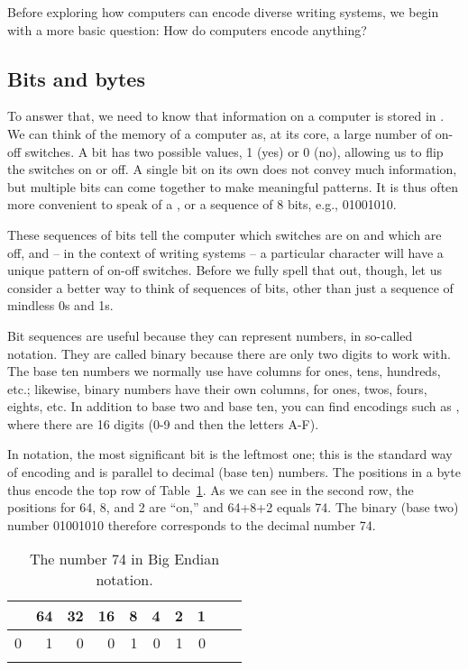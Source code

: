 Before exploring how computers can encode diverse writing systems, we begin with a more basic question:  How do computers encode anything?

\subsection{Bits and bytes}

To answer that, we need to know that information on a computer is
stored in .  We can think of the memory of a computer
as, at its core, a large number of on-off switches.  A bit has two
possible values, 1 (yes) or 0 (no), allowing us to flip the switches
on or off.  A single bit on its own does not convey much information,
but multiple bits can come together to make meaningful patterns.  It
is thus often more convenient to speak of a , or a
sequence of 8 bits, e.g., 01001010.

These sequences of bits tell the computer which switches are on and
which are off, and -- in the context of writing systems -- a particular
character will have a unique pattern of on-off switches.  Before we
fully spell that out, though, let us consider a better way to think of
sequences of bits, other than just a sequence of mindless 0s and 1s.

Bit sequences are useful because they can represent numbers, in
so-called  notation.  They are called binary because
there are only two digits to work with.  The base ten numbers we
normally use have columns for ones, tens, hundreds, etc.; likewise,
binary numbers have their own columns, for ones, twos, fours, eights,
etc.  In addition to base two and base ten, you can find encodings
such as , where there are 16 digits (0-9 and then
the letters A-F).

In  notation, the most significant bit is the
leftmost one; this is the standard way of encoding and is parallel to
decimal (base ten) numbers.  The positions in a byte thus encode the
top row of Table~\ref{fig:big-endian}.  As we can see in the second
row, the positions for 64, 8, and 2 are ``on,'' and
64+8+2 equals 74. The binary (base two) number 01001010 therefore
corresponds to the decimal number 74.

\begin{table}
\begin{tabular}{rrrrrrrrrr}
\lsptoprule
128 & 64 & 32 & 16 & 8 & 4 & 2 & 1 \\
\midrule
0 &  1 &  0 &  0 & 1 & 0 & 1 & 0 \\
\lspbottomrule
\end{tabular}
\caption{The number 74 in Big Endian notation.}
\label{fig:big-endian}
\end{table}
        

